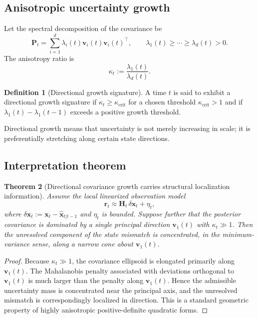 \documentclass[11pt]{article}
\newcommand{\state}{\mathbf{x}}
\newcommand{\resid}{\mathbf{r}}
\newcommand{\covar}{\mathbf{P}}
\newcommand{\Jac}{\mathbf{H}}
\theoremstyle{definition}
\newtheorem{definition}{Definition}[section]
\theoremstyle{plain}
\newtheorem{theorem}[definition]{Theorem}
\begin{document}
\subsection{Anisotropic uncertainty growth}
Let the spectral decomposition of the covariance be
\begin{equation}
    \covar_t = \sum_{i=1}^{d} \lambda_i(t) \mathbf{v}_i(t) \mathbf{v}_i(t)^\top,
    \qquad \lambda_1(t) \ge \cdots \ge \lambda_d(t) > 0.
\end{equation}
The anisotropy ratio is
\begin{equation}
    \kappa_t := \frac{\lambda_1(t)}{\lambda_d(t)}.
\end{equation}

\begin{definition}[Directional growth signature]
A time $t$ is said to exhibit a directional growth signature if $\kappa_t \ge \kappa_{\mathrm{crit}}$ for a chosen threshold $\kappa_{\mathrm{crit}} > 1$ and if $\lambda_1(t)-\lambda_1(t-1)$ exceeds a positive growth threshold.
\end{definition}

Directional growth means that uncertainty is not merely increasing in scale; it is preferentially stretching along certain state directions.

\subsection{Interpretation theorem}
\begin{theorem}[Directional covariance growth carries structural localization information]
Assume the local linearized observation model
\begin{equation}
    \resid_t \approx \Jac_t \, \delta\state_t + \eta_t,
\end{equation}
where $\delta\state_t := \state_t - \hat{\state}_{t|t-1}$ and $\eta_t$ is bounded. Suppose further that the posterior covariance is dominated by a single principal direction $\mathbf{v}_1(t)$ with $\kappa_t \gg 1$. Then the unresolved component of the state mismatch is concentrated, in the minimum-variance sense, along a narrow cone about $\mathbf{v}_1(t)$.
\end{theorem}

\begin{proof}
Because $\kappa_t \gg 1$, the covariance ellipsoid is elongated primarily along $\mathbf{v}_1(t)$. The Mahalanobis penalty associated with deviations orthogonal to $\mathbf{v}_1(t)$ is much larger than the penalty along $\mathbf{v}_1(t)$. Hence the admissible uncertainty mass is concentrated near the principal axis, and the unresolved mismatch is correspondingly localized in direction. This is a standard geometric property of highly anisotropic positive-definite quadratic forms.
\end{proof}
\end{document}
